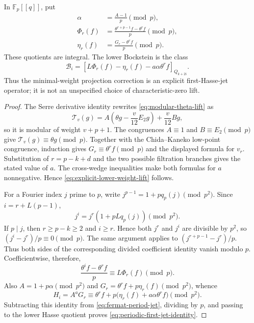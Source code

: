\begin{theorem}
In $\mathbb F_p[[q]]$, put
\begin{align*}
 \alpha&=\frac{A-1}{p}\pmod p,\\
 \Phi_r(f)&=\frac{\theta^{r+p-1}f-\theta^rf}{p}\pmod p,\\
 \eta_r(f)&=\frac{G_r-\theta^rf}{p}\pmod p.
\end{align*}
These quotients are integral.  The lower Bockstein is the class
\begin{equation}\label{eq:periodic-first-jet-identity}
 \boxed{\quad
 \mathcal B_i
 =\left[
 L\Phi_r(f)-\eta_r(f)-a\alpha\theta^rf
 \right]_{Q_{k+2i}}.
 \quad}
\end{equation}
Thus the minimal-weight projection correction is an explicit first-Hasse-jet
operator; it is not an unspecified choice of characteristic-zero lift.
\end{theorem}

\begin{proof}
The Serre derivative identity rewrites \eqref{eq:modular-theta-lift} as
\[
 \mathcal T_v(g)
 =A\left(\theta g-\frac{v}{12}E_2g\right)
   +\frac{v}{12}Bg,
\]
so it is modular of weight $v+p+1$.  The congruences
$A\equiv1$ and $B\equiv E_2\pmod p$ give
$\mathcal T_v(g)\equiv\theta g\pmod p$.  Together with the
Chida--Kaneko low-point congruence, induction gives
$G_r\equiv\theta^rf\pmod p$ and the displayed formula for $v_r$.
Substitution of $r=p-k+d$ and the two possible filtration branches gives
the stated value of $a$.  The cross-wedge inequalities make both formulas
for $a$ nonnegative.  Hence \eqref{eq:explicit-lower-weight-lift} follows.

For a Fourier index $j$ prime to $p$, write
$j^{p-1}=1+p q_p(j)\pmod {p^2}$.  Since
$i=r+L(p-1)$,
\[
 j^i=j^r(1+pLq_p(j))\pmod {p^2}.
\]
If $p\mid j$, then $r\geq p-k\geq2$ and $i\geq r$.  Hence both $j^r$ and
$j^i$ are divisible by $p^2$, so
$(j^i-j^r)/p\equiv0\pmod p$.  The same argument applies to
$(j^{r+p-1}-j^r)/p$.  Thus both sides of the corresponding divided
coefficient identity vanish modulo $p$.  Coefficientwise, therefore,
\begin{equation}\label{eq:fermat-period-jet}
 \frac{\theta^if-\theta^rf}{p}
 \equiv L\Phi_r(f)\pmod p.
\end{equation}
Also $A=1+p\alpha\pmod {p^2}$ and
$G_r=\theta^rf+p\eta_r(f)\pmod {p^2}$, whence
\[
 H_i=A^aG_r
 \equiv\theta^rf+p\bigl(\eta_r(f)+a\alpha\theta^rf\bigr)
 \pmod {p^2}.
\]
Subtracting this identity from \eqref{eq:fermat-period-jet}, dividing by
$p$, and passing to the lower Hasse quotient proves
\eqref{eq:periodic-first-jet-identity}.
\end{proof}

